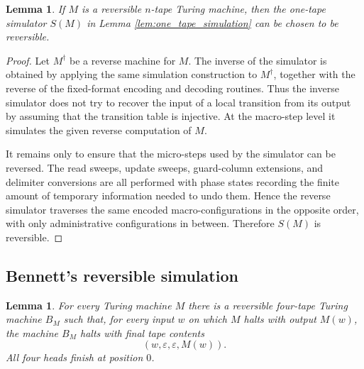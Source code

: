 \documentclass[12pt]{article}
\theoremstyle{plain}
\newtheorem{lemma}[thm]{Lemma}
\theoremstyle{definition}
\begin{document}
\begin{lemma}\label{lem:reversible_one_tape_simulation}
If $M$ is a reversible $n$-tape Turing machine, then the one-tape simulator $S(M)$ in Lemma \ref{lem:one_tape_simulation} can be chosen to be reversible.
\end{lemma}

\begin{proof}
Let $M^\dagger$ be a reverse machine for $M$. The inverse of the simulator is obtained by applying the same simulation construction to $M^\dagger$, together with the reverse of the fixed-format encoding and decoding routines. Thus the inverse simulator does not try to recover the input of a local transition from its output by assuming that the transition table is injective. At the macro-step level it simulates the given reverse computation of $M$.

It remains only to ensure that the micro-steps used by the simulator can be reversed. The read sweeps, update sweeps, guard-column extensions, and delimiter conversions are all performed with phase states recording the finite amount of temporary information needed to undo them. Hence the reverse simulator traverses the same encoded macro-configurations in the opposite order, with only administrative configurations in between. Therefore $S(M)$ is reversible.
\end{proof}

\subsection{Bennett's reversible simulation}

\begin{lemma}\label{lem:bennett_four_tape}
For every Turing machine $M$ there is a reversible four-tape Turing machine $B_M$ such that, for every input $w$ on which $M$ halts with output $M(w)$, the machine $B_M$ halts with final tape contents
\[
(w,\varepsilon,\varepsilon,M(w)).
\]
All four heads finish at position $0$.
\end{lemma}
\end{document}
